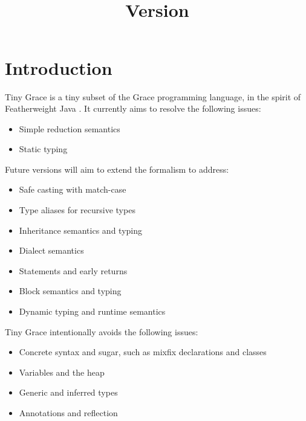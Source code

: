 \documentclass[a4paper, 11pt]{article}
\title{\thetitle\\\normalsize\vspace{0.5em}Version \version\vspace{-0.5em}}
\author{\theauthor}
\theoremstyle{theorem}
\theoremstyle{lemma}
\theoremstyle{tproof}
\theoremstyle{lproof}
\theoremstyle{tcase}
\theoremstyle{lcase}
\begin{document}
\maketitle

\section{Introduction}

Tiny Grace is a tiny subset of the Grace programming language, in the spirit of
Featherweight Java \cite{fj}.  It currently aims to resolve the following
issues:

\begin{itemize}

\item Simple reduction semantics

\item Static typing

\end{itemize}

\noindent Future versions will aim to extend the formalism to address:

\begin{itemize}

\item Safe casting with match-case

\item Type aliases for recursive types

\item Inheritance semantics and typing

\item Dialect semantics

\item Statements and early returns

\item Block semantics and typing

\item Dynamic typing and runtime semantics

\end{itemize}

\noindent Tiny Grace intentionally avoids the following issues:

\begin{itemize}

\item Concrete syntax and sugar, such as mixfix declarations and classes

\item Variables and the heap

\item Generic and inferred types

\item Annotations and reflection

\end{itemize}
\end{document}
